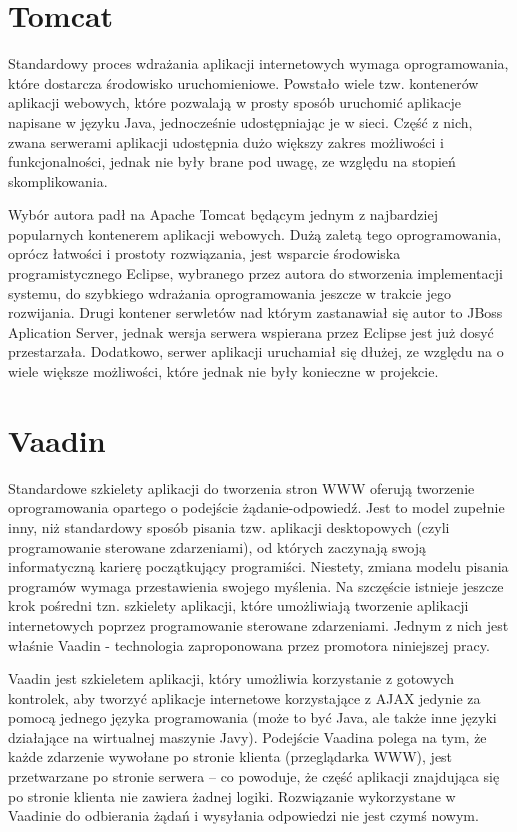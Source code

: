 \section{Tomcat}
Standardowy proces wdrażania aplikacji internetowych wymaga oprogramowania, które dostarcza środowisko uruchomieniowe. Powstało wiele tzw. kontenerów aplikacji webowych, które pozwalają w prosty sposób uruchomić aplikacje napisane w języku Java, jednocześnie udostępniając je w sieci. Część z nich, zwana serwerami aplikacji udostępnia dużo większy zakres możliwości i funkcjonalności, jednak nie były brane pod uwagę, ze względu na stopień skomplikowania. 

Wybór autora padł na Apache Tomcat będącym jednym z najbardziej popularnych kontenerem aplikacji webowych. Dużą zaletą tego oprogramowania, oprócz łatwości i prostoty rozwiązania, jest wsparcie środowiska programistycznego Eclipse, wybranego przez autora do stworzenia implementacji systemu, do szybkiego wdrażania oprogramowania jeszcze w trakcie jego rozwijania. Drugi kontener serwletów nad którym zastanawiał się autor to JBoss Aplication Server, jednak wersja serwera wspierana przez Eclipse jest już dosyć przestarzała. Dodatkowo, serwer aplikacji uruchamiał się dłużej, ze względu na o wiele większe możliwości, które jednak nie były konieczne w projekcie.

\newpage
\section{Vaadin}
Standardowe szkielety aplikacji do tworzenia stron WWW oferują tworzenie oprogramowania opartego o podejście żądanie-odpowiedź. Jest to model zupełnie inny, niż standardowy sposób pisania tzw. aplikacji desktopowych (czyli programowanie sterowane zdarzeniami), od których zaczynają swoją informatyczną karierę początkujący programiści. Niestety, zmiana modelu pisania programów wymaga przestawienia swojego myślenia. Na szczęście istnieje jeszcze krok pośredni tzn. szkielety aplikacji, które umożliwiają tworzenie aplikacji internetowych poprzez programowanie sterowane zdarzeniami. Jednym z nich jest właśnie Vaadin - technologia zaproponowana przez promotora niniejszej pracy.

Vaadin jest szkieletem aplikacji, który umożliwia korzystanie z gotowych kontrolek, aby tworzyć aplikacje internetowe korzystające z AJAX jedynie za pomocą jednego języka programowania (może to być Java, ale także inne języki działające na wirtualnej maszynie Javy). Podejście Vaadina polega na tym, że każde zdarzenie wywołane po stronie klienta (przeglądarka WWW), jest przetwarzane po stronie serwera – co powoduje, że część aplikacji znajdująca się po stronie klienta nie zawiera żadnej logiki. Rozwiązanie wykorzystane w Vaadinie do odbierania żądań i wysyłania odpowiedzi nie jest czymś nowym.

